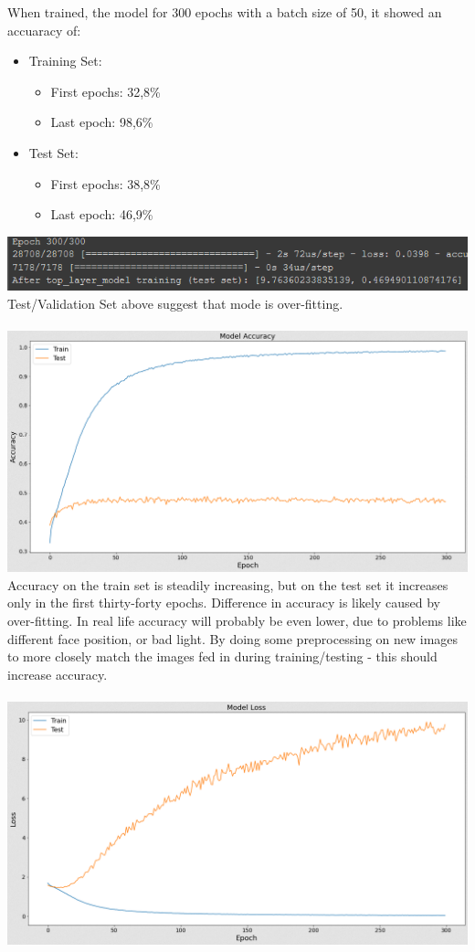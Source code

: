 When trained, the model for 300 epochs with a batch size of 50, it showed an accuaracy of:
\begin{itemize}
      \item Training Set:
        \begin{itemize}
            \item First epochs: 32,8\%
            \item Last epoch: 98,6\%
        \end{itemize}
      \item Test Set:
        \begin{itemize}
            \item First epochs: 38,8\%
            \item Last epoch: 46,9\%
        \end{itemize}
\end{itemize}
\includegraphics[scale=0.9]{images/modelOne/evaluationOne.png}
Test/Validation Set above suggest that mode is over-fitting.\\
\\
\includegraphics[scale=0.5]{images/modelOne/accOne.png}
Accuracy on the train set is steadily increasing, but on the test set it increases only in the first thirty-forty epochs. Difference in accuracy is likely caused by over-fitting. In real life accuracy will probably be even lower, due to problems like different face position, or bad light.  By doing some preprocessing on new images to more closely match the images fed in during training/testing - this should increase accuracy.\\
\\
\includegraphics[scale=0.5]{images/modelOne/lossOne.png}
